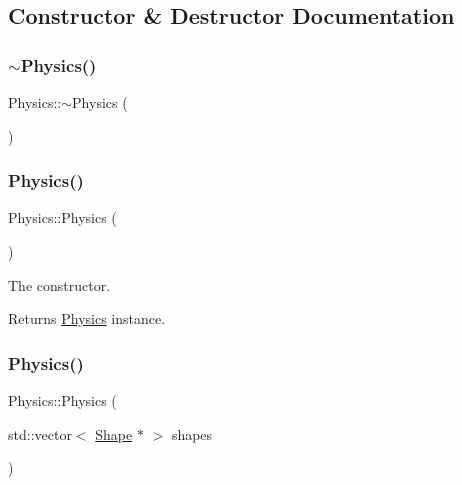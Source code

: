 \subsection{Constructor \& Destructor Documentation}
\mbox{\label{class_physics_a045c3788e28059d3920136499942490f}} 
\subsubsection{\texorpdfstring{$\sim$Physics()}{~Physics()}}
{\footnotesize\ttfamily Physics\+::$\sim$\+Physics (\begin{DoxyParamCaption}{ }\end{DoxyParamCaption})\hspace{0.3cm}{\ttfamily [inline]}}

\mbox{\label{class_physics_a4b2ebc0a344f04f48d227c72f0d0fbda}} 
\subsubsection{\texorpdfstring{Physics()}{Physics()}\hspace{0.1cm}{\footnotesize\ttfamily [1/2]}}
{\footnotesize\ttfamily Physics\+::\+Physics (\begin{DoxyParamCaption}{ }\end{DoxyParamCaption})}



The constructor. 

\begin{DoxyReturn}{Returns}
\mbox{\hyperlink{class_physics}{Physics}} instance. 
\end{DoxyReturn}
\mbox{\label{class_physics_a06eee33fdf21652830746d0900d4b401}} 
\subsubsection{\texorpdfstring{Physics()}{Physics()}\hspace{0.1cm}{\footnotesize\ttfamily [2/2]}}
{\footnotesize\ttfamily Physics\+::\+Physics (\begin{DoxyParamCaption}\item[{std\+::vector$<$ \mbox{\hyperlink{class_shape}{Shape}} $\ast$ $>$}]{shapes }\end{DoxyParamCaption})}



